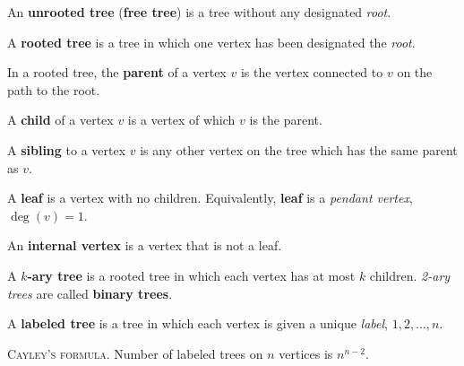 \documentclass[a4paper,10pt]{article}
\newcommand{\op}[1]{\operatorname*{#1}}
\newcommand{\degree}[1]{\op{deg}(#1)}
\begin{document}
\begin{terms}
    \item An \textbf{unrooted tree} (\textbf{free tree}) is a tree without any designated \emph{root}.
    \item A \textbf{rooted tree} is a tree in which one vertex has been designated the \emph{root}.
    \begin{terms}
        \item In a rooted tree, the \textbf{parent} of a vertex $v$ is the vertex connected to $v$ on the path to the root.
        \item A \textbf{child} of a vertex $v$ is a vertex of which $v$ is the parent.
        \item A \textbf{sibling} to a vertex $v$ is any other vertex on the tree which has the same parent as $v$.


        \item A \textbf{leaf} is a vertex with no children. Equivalently, \textbf{leaf} is a \emph{pendant vertex}, \ie $\degree{v} = 1$.
        \item An \textbf{internal vertex} is a vertex that is not a leaf.

        \item A \textbf{$k$-ary tree} is a rooted tree in which each vertex has at most $k$ children. \emph{2-ary trees} are called \textbf{binary trees}.
    \end{terms}

    \item A \textbf{labeled tree} is a tree in which each vertex is given a unique \emph{label}, \eg $1, 2, \dotsc, n$.

    \item \textsc{Cayley's formula}. Number of labeled trees on $n$ vertices is $n^{n-2}$.

    \begingroup



\end{terms}
\end{document}
